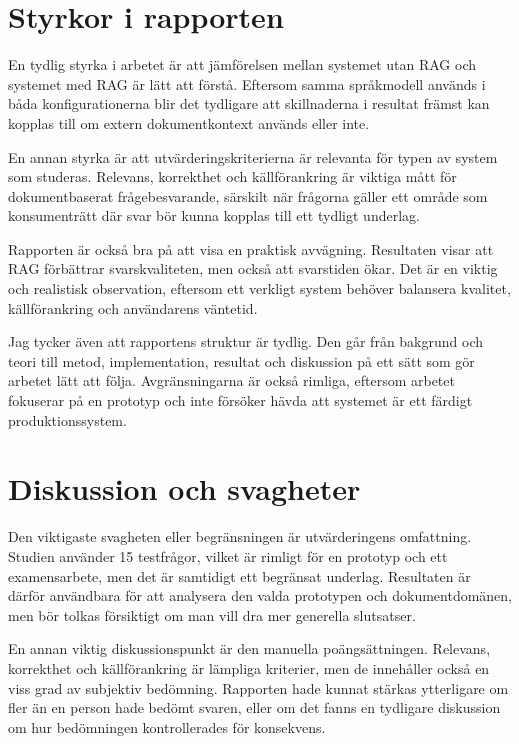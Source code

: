 \documentclass[12pt,a4paper]{article}
\begin{document}
\section{Styrkor i rapporten}

En tydlig styrka i arbetet är att jämförelsen mellan systemet utan RAG och systemet med RAG är lätt att förstå. Eftersom samma språkmodell används i båda konfigurationerna blir det tydligare att skillnaderna i resultat främst kan kopplas till om extern dokumentkontext används eller inte.

En annan styrka är att utvärderingskriterierna är relevanta för typen av system som studeras. Relevans, korrekthet och källförankring är viktiga mått för dokumentbaserat frågebesvarande, särskilt när frågorna gäller ett område som konsumenträtt där svar bör kunna kopplas till ett tydligt underlag.

Rapporten är också bra på att visa en praktisk avvägning. Resultaten visar att RAG förbättrar svarskvaliteten, men också att svarstiden ökar. Det är en viktig och realistisk observation, eftersom ett verkligt system behöver balansera kvalitet, källförankring och användarens väntetid.

Jag tycker även att rapportens struktur är tydlig. Den går från bakgrund och teori till metod, implementation, resultat och diskussion på ett sätt som gör arbetet lätt att följa. Avgränsningarna är också rimliga, eftersom arbetet fokuserar på en prototyp och inte försöker hävda att systemet är ett färdigt produktionssystem.

\section{Diskussion och svagheter}

Den viktigaste svagheten eller begränsningen är utvärderingens omfattning. Studien använder 15 testfrågor, vilket är rimligt för en prototyp och ett examensarbete, men det är samtidigt ett begränsat underlag. Resultaten är därför användbara för att analysera den valda prototypen och dokumentdomänen, men bör tolkas försiktigt om man vill dra mer generella slutsatser.

En annan viktig diskussionspunkt är den manuella poängsättningen. Relevans, korrekthet och källförankring är lämpliga kriterier, men de innehåller också en viss grad av subjektiv bedömning. Rapporten hade kunnat stärkas ytterligare om fler än en person hade bedömt svaren, eller om det fanns en tydligare diskussion om hur bedömningen kontrollerades för konsekvens.
\end{document}

